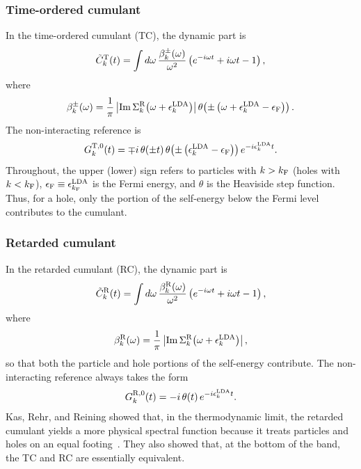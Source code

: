 \documentclass[%
 reprint,
 amsmath,amssymb,
 aps,
]{revtex4-2}
\begin{document}
\subsubsection{Time-ordered cumulant}
In the time-ordered cumulant (TC), the dynamic part is
\begin{equation}
    \tilde{C}_k^{\rm T}(t) = \int d\omega\, \frac{\beta_k^{\pm}(\omega)}{\omega^2}\left(e^{-i \omega t}+i \omega t-1\right),
    \label{eq:tc}
\end{equation}
where
\begin{equation}
\beta_k^{\pm}(\omega) = \frac{1}{\pi}\left|\operatorname{Im} \Sigma_k^{\rm R}\!\left(\omega+\epsilon_k^{\rm LDA}\right)\right| \theta\!\left(\pm\left(\omega + \epsilon_k^{\rm LDA} - \epsilon_{\rm F}\right)\right).
\end{equation}
The non-interacting reference is
\begin{equation}
G_k^{{\rm T},0}(t) = \mp i\, \theta(\pm t)\, \theta\!\left(\pm\left(\epsilon_k^{\rm LDA}-\epsilon_{\rm F}\right)\right) e^{-i \epsilon_k^{\rm LDA} t}.
\end{equation}
Throughout, the upper (lower) sign refers to particles with $k>k_{\rm F}$ (holes with $k<k_{\rm F}$), $\epsilon_{\rm F} \equiv \epsilon_{k_{\rm F}}^{\rm LDA}$ is the Fermi energy, and $\theta$ is the Heaviside step function. Thus, for a hole, only the portion of the self-energy below the Fermi level contributes to the cumulant.

\subsubsection{Retarded cumulant}
In the retarded cumulant (RC), the dynamic part is
\begin{equation}
    \tilde{C}_k^{\rm R}(t) = \int d\omega\, \frac{\beta_k^{\rm R}(\omega)}{\omega^2} \left( e^{-i\omega t} + i\omega t - 1 \right),
    \label{eq:rc}
\end{equation}
where
\begin{equation}
\beta_k^{\rm R}(\omega) = \frac{1}{\pi}\left|\operatorname{Im} \Sigma_k^{\rm R}\!\left(\omega+\epsilon_k^{\rm LDA}\right)\right|,
\end{equation}
so that both the particle and hole portions of the self-energy contribute. The non-interacting reference always takes the form
\begin{equation}
G_k^{{\rm R},0}(t) = -i\, \theta(t)\, e^{-i\epsilon_k^{\rm LDA} t}.
\end{equation}
Kas, Rehr, and Reining showed that, in the thermodynamic limit, the retarded cumulant yields a more physical spectral function because it treats particles and holes on an equal footing~\cite{kas2014}. They also showed that, at the bottom of the band, the TC and RC are essentially equivalent.
\end{document}

